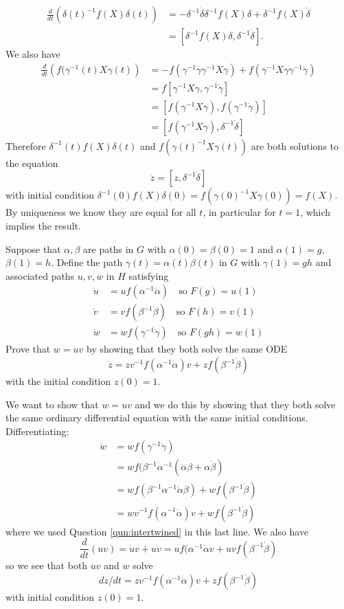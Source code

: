 \documentclass[12pt]{article}
\begin{document}
\begin{answer}
\begin{align*}
\frac{d}{dt}\left(\delta(t)^{-1}f(X)\delta(t)\right)&=-\delta^{-1}\dot{\delta}\delta^{-1}f(X)\delta+\delta^{-1}f(X)\dot{\delta}\\
&=[\delta^{-1}f(X)\delta,\delta^{-1}\dot{\delta}].
\end{align*}
We also have
\begin{align*}
\frac{d}{dt}\left(f(\gamma^{-1}(t)X\gamma(t)\right)&=-f(\gamma^{-1}\dot{\gamma}\gamma^{-1}X\gamma)+f(\gamma^{-1}X\gamma\gamma^{-1}\dot{\gamma})\\
&=f[\gamma^{-1}X\gamma,\gamma^{-1}\dot{\gamma}]\\
&=[f(\gamma^{-1}X\gamma),f(\gamma^{-1}\dot{\gamma})]\\
&=[f(\gamma^{-1}X\gamma),\delta^{-1}\dot{\delta}]
\end{align*}
Therefore $\delta^{-1}(t)f(X)\delta(t)$ and $f(\gamma(t)^{-1}X\gamma(t))$ are both solutions to the equation
\[\dot{z}=[z,\delta^{-1}\dot{\delta}]\]
with initial condition $\delta^{-1}(0)f(X)\delta(0)=f(\gamma(0)^{-1}X\gamma(0))=f(X)$. By uniqueness we know they are equal for all $t$, in particular for $t=1$, which implies the result.
\end{answer}

\begin{question}
Suppose that $\alpha,\beta$ are paths in $G$ with $\alpha(0)=\beta(0)=1$ and $\alpha(1)=g$, $\beta(1)=h$. Define the path $\gamma(t)=\alpha(t)\beta(t)$ in $G$ with $\gamma(1)=gh$ and associated paths $u,v,w$ in $H$ satisfying
\begin{align*}
\dot{u}&=uf(\alpha^{-1}\dot{\alpha})\quad\mbox{so }F(g)=u(1)\\
\dot{v}&=vf(\beta^{-1}\dot{\beta})\quad\mbox{so }F(h)=v(1)\\
\dot{w}&=wf(\gamma^{-1}\dot{\gamma})\quad\mbox{so }F(gh)=w(1)
\end{align*}
Prove that $w=uv$ by showing that they both solve the same ODE
\[\dot{z}=zv^{-1}f(\alpha^{-1}\dot{\alpha})v+zf(\beta^{-1}\dot{\beta})\]
with the initial condition $z(0)=1$.
\end{question}

\begin{answer}
We want to show that $w=uv$ and we do this by showing that they both solve the same ordinary differential equation with the same initial conditions. Differentiating:
\begin{align*}
\dot{w}&=wf(\gamma^{-1}\dot{\gamma})\\
&=wf(\beta^{-1}\alpha^{-1}(\dot{\alpha}\beta+\alpha\dot{\beta})\\
&=wf(\beta^{-1}\alpha^{-1}\dot{\alpha}\beta)+wf(\beta^{-1}\dot{\beta})\\
&=wv^{-1}f(\alpha^{-1}\dot{\alpha})v+wf(\beta^{-1}\dot{\beta})
\end{align*}
where we used Question \ref{qun:intertwined} in this last line. We also have
\[\frac{d}{dt}(uv)=\dot{u}v+u\dot{v}=uf(\alpha^{-1}\dot{\alpha}v+uvf(\beta^{-1}\dot{\beta})\]
so we see that both $uv$ and $w$ solve
\[dz/dt=zv^{-1}f(\alpha^{-1}\dot{\alpha})v+zf(\beta^{-1}\dot{\beta})\]
with initial condition $z(0)=1$.
\end{answer}
\end{document}
